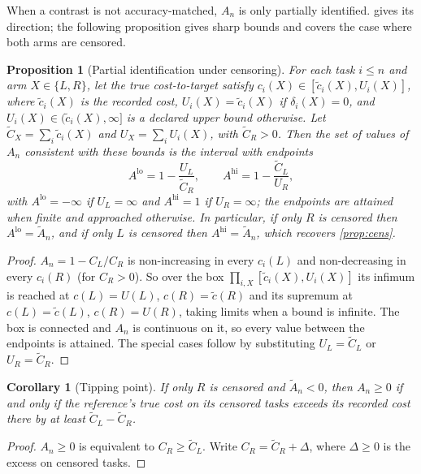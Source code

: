 \documentclass[11pt]{article}
\newtheorem{proposition}{Proposition}
\newtheorem{corollary}{Corollary}
\theoremstyle{remark}
\begin{document}
When a contrast is not accuracy-matched, $A_n$ is only partially identified.  gives its direction; the following proposition gives sharp bounds and covers the case where both arms are censored.

\begin{proposition}[Partial identification under censoring]\label{prop:partial}
For each task $i\le n$ and arm $X\in\{L,R\}$, let the true cost-to-target satisfy $c_i(X)\in[\tilde c_i(X),U_i(X)]$, where $\tilde c_i(X)$ is the recorded cost, $U_i(X)=\tilde c_i(X)$ if $\delta_i(X)=0$, and $U_i(X)\in(\tilde c_i(X),\infty]$ is a declared upper bound otherwise. Let $\tilde C_X=\sum_i\tilde c_i(X)$ and $U_X=\sum_i U_i(X)$, with $\tilde C_R>0$. Then the set of values of $A_n$ consistent with these bounds is the interval with endpoints
\[
A^{\mathrm{lo}}=1-\frac{U_L}{\tilde C_R},\qquad A^{\mathrm{hi}}=1-\frac{\tilde C_L}{U_R},
\]
with $A^{\mathrm{lo}}=-\infty$ if $U_L=\infty$ and $A^{\mathrm{hi}}=1$ if $U_R=\infty$; the endpoints are attained when finite and approached otherwise. In particular, if only $R$ is censored then $A^{\mathrm{lo}}=\tilde A_n$, and if only $L$ is censored then $A^{\mathrm{hi}}=\tilde A_n$, which recovers \cref{prop:cens}.
\end{proposition}
\begin{proof}
$A_n=1-C_L/C_R$ is non-increasing in every $c_i(L)$ and non-decreasing in every $c_i(R)$ (for $C_R>0$). So over the box $\prod_{i,X}[\tilde c_i(X),U_i(X)]$ its infimum is reached at $c(L)=U(L)$, $c(R)=\tilde c(R)$ and its supremum at $c(L)=\tilde c(L)$, $c(R)=U(R)$, taking limits when a bound is infinite. The box is connected and $A_n$ is continuous on it, so every value between the endpoints is attained. The special cases follow by substituting $U_L=\tilde C_L$ or $U_R=\tilde C_R$.
\end{proof}

\begin{corollary}[Tipping point]\label{cor:tip}
If only $R$ is censored and $\tilde A_n<0$, then $A_n\ge0$ if and only if the reference's true cost on its censored tasks exceeds its recorded cost there by at least $\tilde C_L-\tilde C_R$.
\end{corollary}
\begin{proof}
$A_n\ge0$ is equivalent to $C_R\ge\tilde C_L$. Write $C_R=\tilde C_R+\Delta$, where $\Delta\ge0$ is the excess on censored tasks.
\end{proof}
\end{document}
